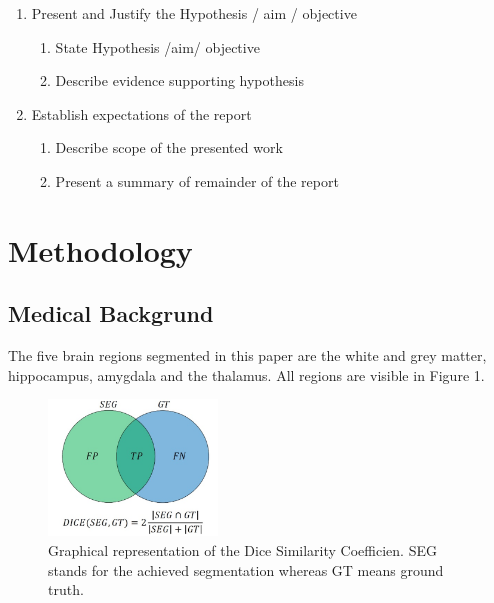 \documentclass[conference]{IEEEtran}
\begin{document}
{\begin{enumerate}
\begin{enumerate}
	\end{enumerate}
\item Present and Justify the Hypothesis / aim / objective
	\begin{enumerate}
	\item State Hypothesis /aim/ objective
	\item Describe evidence supporting hypothesis
	\end{enumerate}
\item Establish expectations of the report
	\begin{enumerate}
	\item Describe scope of the presented work
	\item Present a summary of remainder of the report\\
	\end{enumerate}
\end{enumerate} 
}




\section{Methodology}
\subsection{Medical Backgrund}
	The five brain regions segmented in this paper are the white and grey matter, hippocampus, amygdala and the thalamus. All regions are visible in Figure 1.

	\begin{figure}[h]
		\centering
		\includegraphics[width=0.4\textwidth]{diceGraphics.png}
		\caption{Graphical representation of the Dice Similarity Coefficien. SEG stands for the achieved segmentation whereas GT means ground truth.}
		\label{fig:e8}
	\end{figure}
\end{document}
